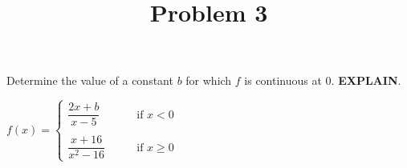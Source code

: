 \documentclass{ximera}
\title[Problem 3]{Problem 3}
\begin{document}
\begin{abstract} \end{abstract}
\maketitle

\begin{problem}
Determine the value of a constant $b$ for which $f$ is continuous at $0$. \textbf{EXPLAIN}.
	
	$f(x) =   \left\{ \begin{array}{ll}
	\dfrac{2x+b}{x-5}	 	&	\qquad \text{if } x < 0	\\ \\
	\dfrac{x+16}{x^2-16}		&	\qquad \text{if } x \ge 0	\end{array} \right.  $

\end{problem}
\end{document}
